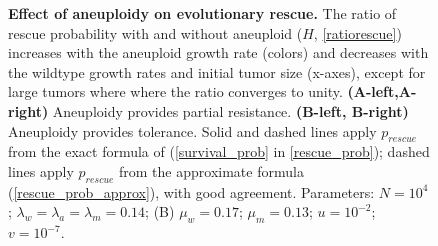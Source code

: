 \documentclass[12pt]{extarticle}
\begin{document}
\begin{figure}
\begin{subfigure}{0.5\textwidth}
\end{subfigure}
\caption{\textbf{Effect of aneuploidy on evolutionary rescue.}
The ratio of rescue probability with and without aneuploid ($H$, \cref{ratiorescue}) increases with the aneuploid growth rate (colors) and decreases with the wildtype growth rates and initial tumor size (x-axes), except for large tumors where where the ratio converges to unity.
\textbf{(A-left,A-right)} Aneuploidy provides partial resistance.
\textbf{(B-left, B-right)} Aneuploidy provides tolerance.  
Solid and dashed lines apply $p_{rescue}$ from the exact formula of  (\cref{survival_prob} in \cref{rescue_prob}); dashed lines apply $p_{rescue}$ from the approximate formula (\cref{rescue_prob_approx}), with good agreement.
Parameters: $N=10^4$; $\lambda_w=\lambda_a=\lambda_m=0.14$; (B) $\mu_w=0.17$; $\mu_m=0.13$; $u=10^{-2}$; $v=10^{-7}$.
}
\label{rescue_ratio}
\end{figure}

\end{document}
